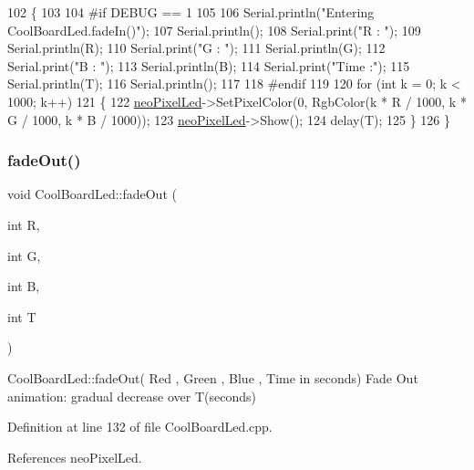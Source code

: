 \begin{DoxyCode}
102 \{
103 
104 \textcolor{preprocessor}{#if DEBUG == 1}
105 
106     Serial.println(\textcolor{stringliteral}{"Entering CoolBoardLed.fadeIn()"});
107     Serial.println();
108     Serial.print(\textcolor{stringliteral}{"R : "});
109     Serial.println(R);
110     Serial.print(\textcolor{stringliteral}{"G : "});
111     Serial.println(G);
112     Serial.print(\textcolor{stringliteral}{"B : "});
113     Serial.println(B);
114     Serial.print(\textcolor{stringliteral}{"Time :"});
115     Serial.println(T);
116     Serial.println();
117 
118 \textcolor{preprocessor}{#endif  }
119 
120     \textcolor{keywordflow}{for} (\textcolor{keywordtype}{int} k = 0; k < 1000; k++) 
121     \{
122         \hyperlink{classCoolBoardLed_ac2c13fa462a010cd9242bf297c013923}{neoPixelLed}->SetPixelColor(0, RgbColor(k * R / 1000, k * G / 1000, k * B / 1000));
123         \hyperlink{classCoolBoardLed_ac2c13fa462a010cd9242bf297c013923}{neoPixelLed}->Show();
124         delay(T);
125     \}
126 \}
\end{DoxyCode}
\mbox{\label{classCoolBoardLed_a27c4e14fa2cd3639c0844152cea98887}} 
\subsubsection{\texorpdfstring{fade\+Out()}{fadeOut()}}
{\footnotesize\ttfamily void Cool\+Board\+Led\+::fade\+Out (\begin{DoxyParamCaption}\item[{int}]{R,  }\item[{int}]{G,  }\item[{int}]{B,  }\item[{int}]{T }\end{DoxyParamCaption})}

Cool\+Board\+Led\+::fade\+Out( Red , Green , Blue , Time in seconds) Fade Out animation\+: gradual decrease over T(seconds) 

Definition at line 132 of file Cool\+Board\+Led.\+cpp.



References neo\+Pixel\+Led.


